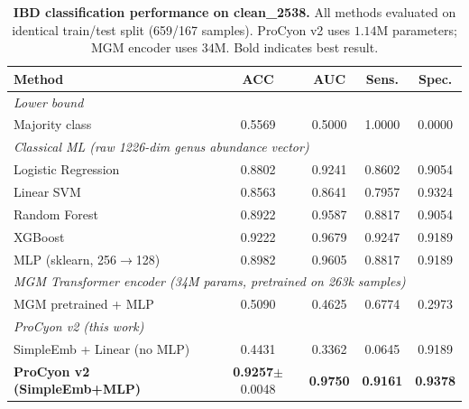 
\begin{table}[t]
\centering
\caption{\textbf{IBD classification performance on clean\_2538.}
All methods evaluated on identical train/test split (659/167 samples).
ProCyon v2 uses $1.14$M parameters; MGM encoder uses $34$M.
Bold indicates best result.}
\label{tab:baselines}
\begin{tabular}{lcccc}
\toprule
\textbf{Method} & \textbf{ACC} & \textbf{AUC} & \textbf{Sens.} & \textbf{Spec.} \\
\midrule
\multicolumn{5}{l}{\textit{Lower bound}} \\
\;\; Majority class & 0.5569 & 0.5000 & 1.0000 & 0.0000 \\
\midrule
\multicolumn{5}{l}{\textit{Classical ML (raw 1226-dim genus abundance vector)}} \\
\;\; Logistic Regression & 0.8802 & 0.9241 & 0.8602 & 0.9054 \\
\;\; Linear SVM & 0.8563 & 0.8641 & 0.7957 & 0.9324 \\
\;\; Random Forest & 0.8922 & 0.9587 & 0.8817 & 0.9054 \\
\;\; XGBoost & 0.9222 & 0.9679 & 0.9247 & 0.9189 \\
\;\; MLP (sklearn, 256$\rightarrow$128) & 0.8982 & 0.9605 & 0.8817 & 0.9189 \\
\midrule
\multicolumn{5}{l}{\textit{MGM Transformer encoder (34M params, pretrained on 263k samples)}} \\
\;\; MGM pretrained + MLP & 0.5090 & 0.4625 & 0.6774 & 0.2973 \\
\midrule
\multicolumn{5}{l}{\textit{ProCyon v2 (this work)}} \\
\;\; SimpleEmb + Linear (no MLP) & 0.4431 & 0.3362 & 0.0645 & 0.9189 \\
\;\; \textbf{ProCyon v2 (SimpleEmb+MLP)} & \textbf{0.9257}$\pm$0.0048 & \textbf{0.9750} & \textbf{0.9161} & \textbf{0.9378} \\
\bottomrule
\end{tabular}
\end{table}



